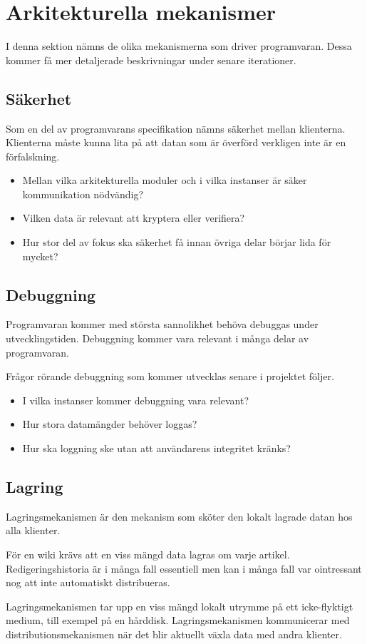 \section{Arkitekturella mekanismer}
I denna sektion nämns de olika mekanismerna som driver programvaran. Dessa kommer få mer detaljerade beskrivningar under senare iterationer.
\subsection{Säkerhet}
Som en del av programvarans specifikation nämns säkerhet mellan klienterna. Klienterna måste kunna lita på att datan som är överförd verkligen inte är en förfalskning.

\begin{itemize}
\item Mellan vilka arkitekturella moduler och i vilka instanser är säker kommunikation nödvändig?
\item Vilken data är relevant att kryptera eller verifiera?
\item Hur stor del av fokus ska säkerhet få innan övriga delar börjar lida för mycket?
\end{itemize}
\subsection{Debuggning}
Programvaran kommer med största sannolikhet behöva debuggas under utvecklingstiden. Debuggning kommer vara relevant i många delar av programvaran.

Frågor rörande debuggning som kommer utvecklas senare i projektet följer.
\begin{itemize}
\item I vilka instanser kommer debuggning vara relevant?
\item Hur stora datamängder behöver loggas?
\item Hur ska loggning ske utan att användarens integritet kränks?
\end{itemize}
\subsection{Lagring}
Lagringsmekanismen är den mekanism som sköter den lokalt lagrade datan hos alla klienter.

För en wiki krävs att en viss mängd data lagras om varje artikel. Redigeringshistoria är i många fall essentiell men kan i många fall var ointressant nog att inte automatiskt distribueras.

Lagringsmekanismen tar upp en viss mängd lokalt utrymme på ett icke-flyktigt medium, till exempel på en hårddisk. Lagringsmekanismen kommunicerar med distributionsmekanismen när det blir aktuellt växla data med andra klienter.

